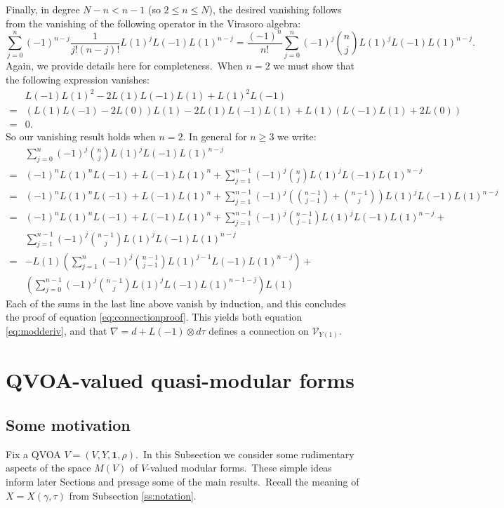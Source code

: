 \documentclass[12pt]{amsart}
\theoremstyle{plain}
\theoremstyle{definition}
\theoremstyle{remark}
\newcommand{\cV}{\mathcal{V}}
\begin{document}
\medskip
Finally, in degree $N-n < n-1$ (so $2 \leq n \leq N$), the desired vanishing follows from the vanishing of the following operator in the Virasoro algebra:
\[
\sum_{j=0}^n (-1)^{n-j}\frac{1}{j!(n-j)!}L(1)^jL(-1)L(1)^{n-j} = \frac{(-1)^n}{n!}\sum_{j=0}^n(-1)^{j}\binom{n}{j} L(1)^jL(-1)L(1)^{n-j}.
\]
Again, we provide details here for completeness.\ When $n=2$ we must show that the following expression vanishes:
\begin{align*}
&L(-1)L(1)^2 - 2L(1)L(-1)L(1)+L(1)^2L(-1)\\
=& (L(1)L(-1)-2L(0))L(1) - 2L(1)L(-1)L(1)+L(1)(L(-1)L(1)+2L(0))\\
=&0.
\end{align*}
So our vanishing result holds when $n=2$. In general for $n\geq 3$ we write:
\begin{align*}
&\sum_{j=0}^n(-1)^{j}\binom{n}{j} L(1)^jL(-1)L(1)^{n-j}\\
=& (-1)^nL(1)^nL(-1)+L(-1)L(1)^n+\sum_{j=1}^{n-1}(-1)^{j}\binom{n}{j} L(1)^jL(-1)L(1)^{n-j}\\
=&(-1)^nL(1)^nL(-1)+L(-1)L(1)^n+\sum_{j=1}^{n-1}(-1)^{j}\left(\binom{n-1}{j-1}+\binom{n-1}{j}\right) L(1)^jL(-1)L(1)^{n-j}\\
=&(-1)^nL(1)^nL(-1)+L(-1)L(1)^n+\sum_{j=1}^{n-1}(-1)^{j}\binom{n-1}{j-1} L(1)^jL(-1)L(1)^{n-j}+\\
&\sum_{j=1}^{n-1}(-1)^{j}\binom{n-1}{j}L(1)^jL(-1)L(1)^{n-j}\\
=&-L(1)\left(\sum_{j=1}^{n}(-1)^{j}\binom{n-1}{j-1} L(1)^{j-1}L(-1)L(1)^{n-j}\right)+\\
&\left(\sum_{j=0}^{n-1}(-1)^{j}\binom{n-1}{j}L(1)^jL(-1)L(1)^{n-1-j}\right)L(1)
\end{align*}
Each of the sums in the last line above vanish by induction, and this concludes the proof of equation \eqref{eq:connectionproof}. This yields both equation \eqref{eq:modderiv}, and that $\nabla = d + L(-1)\otimes d\tau $ defines a connection on $\cV_{Y(1)}$.



\section{QVOA-valued quasi-modular forms}
\label{s:qmf}
\subsection{Some motivation}
\label{ss:qmfmotivation}
Fix a QVOA $V=(V, Y, \mathbf{1}, \rho)$.\ In this Subsection we consider some rudimentary aspects of the space $M(V)$ of $V$-valued modular forms.\ These simple ideas inform later Sections and presage some of the main results.\
Recall the meaning of $X=X(\gamma, \tau)$ from
Subsection \ref{ss:notation}.
\end{document}
